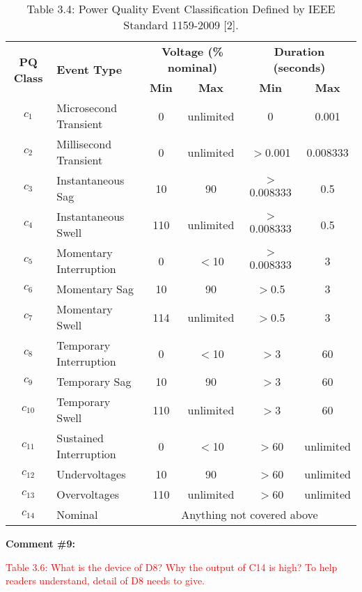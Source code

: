 \documentclass[journal]{IEEEtran}
\begin{document}
\begin{table}[!h]
\center \color{blue}
\caption*{\color{blue}Table 3.4: Power Quality Event Classification Defined by IEEE Standard 1159-2009 [2].}
\centering \renewcommand*{\arraystretch}{1.3} 
\begin{tabular}{|c|l|c|c|c|c|}
\hline \multirow{2}{*}{\textbf{PQ Class}} & \multirow{2}{*}{\textbf{Event Type}} & \multicolumn{2}{c}{\textbf{Voltage (\% nominal)}} & \multicolumn{2}{|c|}{\textbf{Duration (seconds)}} \\
\cline{3-6}   &  & \textbf{Min} & \textbf{Max} & \textbf{Min} & \textbf{Max} \\ 
\hline  $c_1$ & Microsecond Transient  & 0   & unlimited & 0           & 0.001    \\
$c_2$ & Millisecond Transient  & 0   & unlimited & $>$0.001    & 0.008333 \\
$c_3$ & Instantaneous Sag      & 10  & 90        & $>$0.008333 & 0.5      \\
$c_4$ & Instantaneous Swell    & 110 & unlimited & $>$0.008333 & 0.5      \\
$c_5$ & Momentary Interruption & 0   & $<$10     & $>$0.008333 & 3        \\
$c_6$ & Momentary Sag          & 10  & 90        & $>$0.5      & 3        \\
$c_7$ & Momentary Swell        & 114 & unlimited & $>$0.5      & 3        \\
$c_8$ & Temporary Interruption & 0   & $<$10     & $>$3        & 60       \\
$c_9$ & Temporary Sag          & 10  & 90        & $>$3        & 60       \\
$c_{10}$ & Temporary Swell        & 110 & unlimited & $>$3        & 60       \\
$c_{11}$ & Sustained Interruption & 0   & $<$10     & $>$60       & unlimited\\
$c_{12}$ & Undervoltages          & 10  & 90        & $>$60       & unlimited\\
$c_{13}$ & Overvoltages           & 110 & unlimited & $>$60       & unlimited\\
\hline $c_{14}$ & Nominal                & \multicolumn{4}{c|}{Anything not covered above} \\ \hline
\end{tabular}
\end{table}


\vspace{30pt}
\textbf{Comment \#9:}
\begin{adjustwidth}{2.5em}{0pt}
\singlespacing \vspace{-10pt}
\textcolor{red}{Table 3.6: What is the device of D8? Why the output of C14 is high?  To help readers understand, detail of D8 needs to give.}
\end{adjustwidth}
\end{document}
